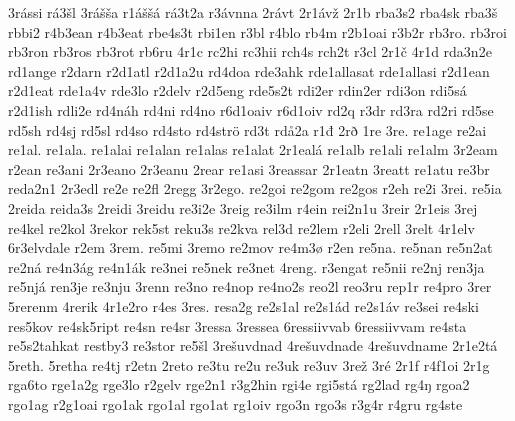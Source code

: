 {    3rássi
    rá3šl
    3rášša
    r1áššá
    rá3t2a
    r3ávnna
    2rávt
    2r1ávž
    2r1b
    rba3s2
    rba4sk
    rba3š
    rbbi2
    r4b3ean
    r4b3eat
    rbe4s3t
    rbi1en
    r3bl
    r4blo
    rb4m
    r2b1oai
    r3b2r
    rb3ro.
    rb3roi
    rb3ron
    rb3ros
    rb3rot
    rb6ru
    4r1c
    rc2hi
    rc3hii
    rch4s
    rch2t
    r3cl
    2r1č
    4r1d
    rda3n2e
    rd1ange
    r2darn
    r2d1atl
    r2d1a2u
    rd4doa
    rde3ahk
    rde1allasat
    rde1allasi
    r2d1ean
    r2d1eat
    rde1a4v
    rde3lo
    r2delv
    r2d5eng
    rde5s2t
    rdi2er
    rdin2er
    rdi3on
    rdi5sá
    r2d1ish
    rdli2e
    rd4náh
    rd4ni
    rd4no
    r6d1oaiv
    r6d1oiv
    rd2q
    r3dr
    rd3ra
    rd2ri
    rd5se
    rd5sh
    rd4sj
    rd5sl
    rd4so
    rd4sto
    rd4strö
    rd3t
    rdå2a
    r1đ
    2rð
    1re
    3re.
    re1age
    re2ai
    re1al.
    re1ala.
    re1alai
    re1alan
    re1alas
    re1alat
    2r1ealá
    re1alb
    re1ali
    re1alm
    3r2eam
    r2ean
    re3ani
    2r3eano
    2r3eanu
    2rear
    re1asi
    3reassar
    2r1eatn
    3reatt
    re1atu
    re3br
    reda2n1
    2r3edl
    re2e
    re2fl
    2regg
    3r2ego.
    re2goi
    re2gom
    re2gos
    r2eh
    re2i
    3rei.
    re5ia
    2reida
    reida3s
    2reidi
    3reidu
    re3i2e
    3reig
    re3ilm
    r4ein
    rei2n1u
    3reir
    2r1eis
    3rej
    re4kel
    re2kol
    3rekor
    rek5st
    reku3s
    re2kva
    rel3d
    re2lem
    r2eli
    2rell
    3relt
    4r1elv
    6r3elvdale
    r2em
    3rem.
    re5mi
    3remo
    re2mov
    re4m3ø
    r2en
    re5na.
    re5nan
    re5n2at
    re2ná
    re4n3ág
    re4n1ák
    re3nei
    re5nek
    re3net
    4reng.
    r3engat
    re5nii
    re2nj
    ren3ja
    re5njá
    ren3je
    re3nju
    3renn
    re3no
    re4nop
    re4no2s
    reo2l
    reo3ru
    rep1r
    re4pro
    3rer
    5rerenm
    4rerik
    4r1e2ro
    r4es
    3res.
    resa2g
    re2s1al
    re2s1ád
    re2s1áv
    re3sei
    re4ski
    res5kov
    re4sk5ript
    re4sn
    re4sr
    3ressa
    3ressea
    6ressiivvab
    6ressiivvam
    re4sta
    re5s2tahkat
    restby3
    re3stor
    re5šl
    3rešuvdnad
    4rešuvdnade
    4rešuvdname
    2r1e2tá
    5reth.
    5retha
    re4tj
    r2etn
    2reto
    re3tu
    re2u
    re3uk
    re3uv
    3rež
    3ré
    2r1f
    r4f1oi
    2r1g
    rga6to
    rge1a2g
    rge3lo
    r2gelv
    rge2n1
    r3g2hin
    rgi4e
    rgi5stá
    rg2lad
    rg4ŋ
    rgoa2
    rgo1ag
    r2g1oai
    rgo1ak
    rgo1al
    rgo1at
    rg1oiv
    rgo3n
    rgo3s
    r3g4r
    r4gru
    rg4ste
}
